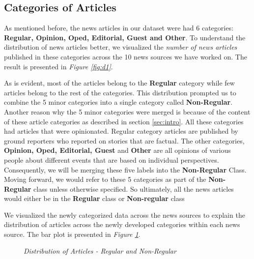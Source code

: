 \documentclass[11pt]{article}
\begin{document}
\subsection{Categories of Articles}
As mentioned before, the news articles in our dataset were had 6 categories: \textbf{Regular, Opinion, Oped, Editorial, Guest and Other}. To understand the distribution of news articles better, we visualized the \textit{number of news articles} published in these categories across the 10 news sources we have worked on. The result is presented in \textit{Figure \ref{fig:d1}}.

As is evident, most of the articles belong to the \textbf{Regular} category while few articles belong to the rest of the categories. This distribution prompted us to combine the 5 minor categories into a single category called \textbf{Non-Regular}. Another reason why the 5 minor categories were merged is because of the content of these article categories as described in section \ref{sec:intro}. All these categories had articles that were opinionated. Regular category articles are published by ground reporters who reported on stories that are factual. The other categories, \textbf{Opinion, Oped, Editorial, Guest} and \textbf{Other} are all opinions of various people about different events that are based on individual perspectives. Consequently, we will be merging these five labels into the  \textbf{Non-Regular} Class.
Moving forward, we would refer to these 5 categories as part of the \textbf{Non-Regular} class unless otherwise specified. So ultimately, all the news articles would either be in the\textbf{ Regular} class or \textbf{Non-regular} class

We visualized the newly categorized data across the news sources to explain the distribution of articles across the newly developed categories within each news source. The bar plot is presented in \textit{Figure \ref{fig:d2}}.

\begin{figure}[!htb]
\caption{\label{fig:d2}  \textit{Distribution of Articles - Regular and Non-Regular}}
\end{figure}
\end{document}
